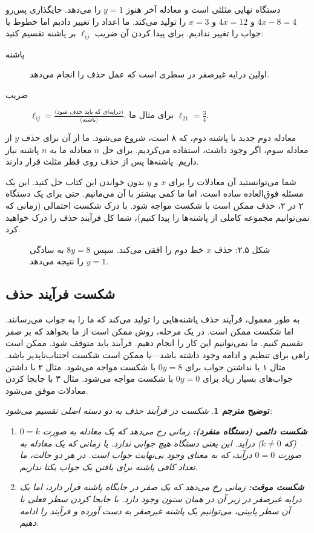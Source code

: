 \documentclass[12pt, a4paper]{book}
\theoremstyle{translator}
\newtheorem*{translator}{توضیح مترجم}
\begin{document}
	دستگاه نهایی مثلثی است و معادله آخر هنوز $y=1$ را می‌دهد. جایگذاری پس‌رو $4x - 8 = 4$ و $4x = 12$ و $x=3$ را تولید می‌کند. ما اعداد را تغییر دادیم اما خطوط یا جواب را تغییر ندادیم. برای پیدا کردن آن ضریب $\ell_{ij}$ بر پاشنه تقسیم کنید:
	\begin{description}
		\item[پاشنه] اولین درایه غیرصفر در سطری است که عمل حذف را انجام می‌دهد.
		\item[ضریب] $\ell_{ij} = \frac{\text{(درایه‌ای که باید حذف شود)}}{\text{(پاشنه)}}$. برای مثال ما $\ell_{21} = \frac{3}{4}$.
	\end{description}
	معادله دوم جدید با پاشنه دوم، که ۸ است، شروع می‌شود. ما از آن برای حذف $y$ از معادله سوم، اگر وجود داشت، استفاده می‌کردیم. برای حل $n$ معادله ما به $n$ پاشنه نیاز داریم. پاشنه‌ها پس از حذف روی قطر مثلث قرار دارند.
	
	شما می‌توانستید آن معادلات را برای $x$ و $y$ بدون خواندن این کتاب حل کنید. این یک مسئله فوق‌العاده ساده است، اما ما کمی بیشتر با آن می‌مانیم. حتی برای یک دستگاه ۲ در ۲، حذف ممکن است با شکست مواجه شود. با درک شکست احتمالی (زمانی که نمی‌توانیم مجموعه کاملی از پاشنه‌ها را پیدا کنیم)، شما کل فرآیند حذف را درک خواهید کرد.
	
	\begin{figure}[h!]
		\centering
		\caption{شکل ۲.۵: حذف $x$ خط دوم را افقی می‌کند. سپس $8y = 8$ به سادگی $y=1$ را نتیجه می‌دهد.}
	\end{figure}
	
	\subsection*{شکست فرآیند حذف}
	به طور معمول، فرآیند حذف پاشنه‌هایی را تولید می‌کند که ما را به جواب می‌رسانند. اما شکست ممکن است. در یک مرحله، روش ممکن است از ما بخواهد که بر صفر تقسیم کنیم. ما نمی‌توانیم این کار را انجام دهیم. فرآیند باید متوقف شود. ممکن است راهی برای تنظیم و ادامه وجود داشته باشد—یا ممکن است شکست اجتناب‌ناپذیر باشد. مثال ۱ با نداشتن جواب برای $0y=8$ با شکست مواجه می‌شود. مثال ۲ با داشتن جواب‌های بسیار زیاد برای $0y=0$ با شکست مواجه می‌شود. مثال ۳ با جابجا کردن معادلات موفق می‌شود.
	
	\begin{translator}
		شکست در فرآیند حذف به دو دسته اصلی تقسیم می‌شود:
		\begin{enumerate}
			\item \textbf{شکست دائمی (دستگاه منفرد):} زمانی رخ می‌دهد که یک معادله به صورت $0=k$ (که $k \neq 0$) درآید. این یعنی دستگاه هیچ جوابی ندارد. یا زمانی که یک معادله به صورت $0=0$ درآید، که به معنای وجود بی‌نهایت جواب است. در هر دو حالت، ما تعداد کافی پاشنه برای یافتن یک جواب یکتا نداریم.
			\item \textbf{شکست موقت:} زمانی رخ می‌دهد که یک صفر در جایگاه پاشنه قرار دارد، اما یک درایه غیرصفر در زیر آن در همان ستون وجود دارد. با جابجا کردن سطر فعلی با آن سطر پایینی، می‌توانیم یک پاشنه غیرصفر به دست آورده و فرآیند را ادامه دهیم.
		\end{enumerate}
	\end{translator}
	
\end{document}
